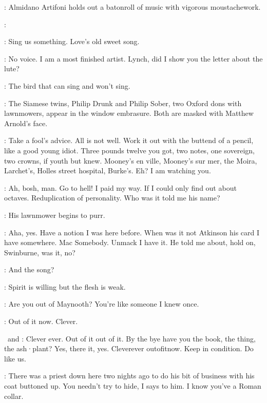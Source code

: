 :
Almidano Artifoni holds out a batonroll of music with vigorous moustachework.

\Artifoni:

\Florry[1]:
Sing us something.
Love's old sweet song.

\Stephen:
No voice.
I am a most finished artist.
Lynch,
did I show you the letter about the lute?

\Florry:
The bird that can sing and won't sing.

:
The Siamese twins,
Philip Drunk and Philip Sober,
two Oxford dons with lawnmowers,
appear in the window embrasure.
Both are masked with Matthew Arnold's face.

\PhilipSober[2]:
Take a fool's advice.
All is not well.
Work it out with the buttend of a pencil,
like a good young idiot.
Three pounds twelve you got,
two notes,
one sovereign,
two crowns,
if youth but knew.
Mooney's en ville,
Mooney's sur mer,
the Moira,
Larchet's,
Holles street hospital,
Burke's.
Eh?
I am watching you.%

\PhilipDrunk[2]:
Ah,
bosh,
man.
Go to hell!
I paid my way.
If I could only find out about octaves.
Reduplication of personality.
Who was it told me his name?

:
His lawnmower begins to purr.

\PhilipDrunk:
Aha,
yes.
Have a notion I was here before.
When was it not Atkinson his card I have somewhere.
Mac Somebody.
Unmack I have it.
He told me about,
hold on,
Swinburne,
was it,
no?

\Florry:
And the song?

\Stephen:
Spirit is willing but the flesh is weak.

\Florry:
Are you out of Maynooth?
You're like someone I knew once.

\Stephen:
Out of it now.
Clever.


\PhilipDrunk\ and \PhilipSober:
Clever ever.
Out of it out of it.
By the bye have you the book,
the thing,
the ash·plant?
Yes,
there it,
yes.
Cleverever outofitnow.
Keep in condition.
Do like us.

\Zoe:
There was a priest down here two nights ago
to do his bit of business with his coat buttoned up.
You needn't try to hide,
I says to him.
I know you've a Roman collar.

